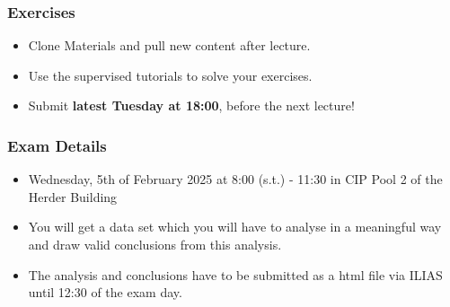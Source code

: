 \documentclass{beamer}
\begin{document}
\begin{frame}
\frametitle{Exercises}


\begin{itemize}
    \item Clone Materials and pull new content after lecture.
    \item Use the supervised tutorials to solve your exercises.
    \item Submit \textbf{latest Tuesday at 18:00}, before the next lecture!
\end{itemize}
\vspace{2em}

\end{frame}

\begin{frame}
\frametitle{Exam Details}
\begin{itemize}
    \item Wednesday, 5th of February 2025 at 8:00 (s.t.) - 11:30 in CIP Pool 2 of the Herder Building
    \item You will get a data set which you will have to analyse in a meaningful way and draw valid conclusions from this analysis.
    \item The analysis and conclusions have to be submitted as a html file via ILIAS until 12:30 of the exam day.
\end{itemize}
\vspace{2em}
\begin{center}
    \textbf{\color{red}{Register for the exam latest on 1st of February! }}
\end{center}
\end{frame}
\end{document}
